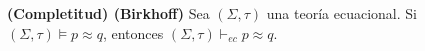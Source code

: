   \begin{theorem}
    \PN \textbf{(Completitud) (Birkhoff)} Sea $(\Sigma, \tau)$ una teoría ecuacional. Si $(\Sigma, \tau) \models p
    \approx q$, entonces $(\Sigma, \tau) \vdash_{ec} p \approx q$.
  \end{theorem}
